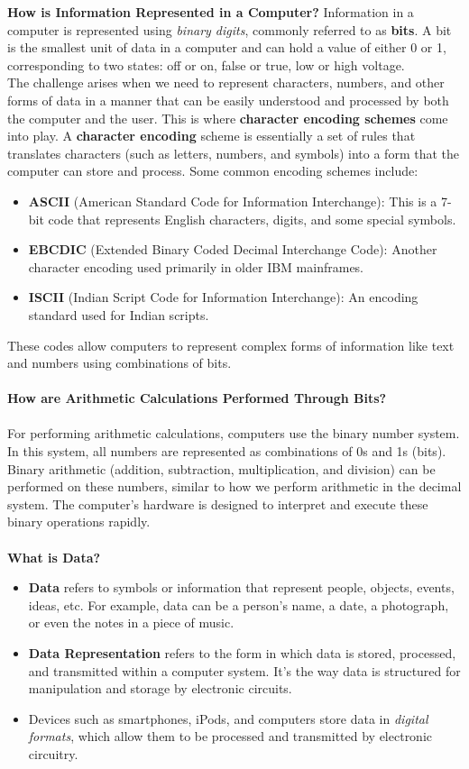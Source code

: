 \documentclass[12pt, oneside]{book}
\begin{document}
\textbf{How is Information Represented in a Computer?}  
Information in a computer is represented using \textit{binary digits}, commonly referred to as \textbf{bits}. A bit is the smallest unit of data in a computer and can hold a value of either 0 or 1, corresponding to two states: off or on, false or true, low or high voltage. \\
The challenge arises when we need to represent characters, numbers, and other forms of data in a manner that can be easily understood and processed by both the computer and the user. This is where \textbf{character encoding schemes} come into play.
A \textbf{character encoding} scheme is essentially a set of rules that translates characters (such as letters, numbers, and symbols) into a form that the computer can store and process. Some common encoding schemes include:
\begin{itemize}
	\item \textbf{ASCII} (American Standard Code for Information Interchange): This is a 7-bit code that represents English characters, digits, and some special symbols.
	\item \textbf{EBCDIC} (Extended Binary Coded Decimal Interchange Code): Another character encoding used primarily in older IBM mainframes.
	\item \textbf{ISCII} (Indian Script Code for Information Interchange): An encoding standard used for Indian scripts.
\end{itemize}
These codes allow computers to represent complex forms of information like text and numbers using combinations of bits.\\\\
\textbf{How are Arithmetic Calculations Performed Through Bits?}\\\\
For performing arithmetic calculations, computers use the binary number system. In this system, all numbers are represented as combinations of 0s and 1s (bits). Binary arithmetic (addition, subtraction, multiplication, and division) can be performed on these numbers, similar to how we perform arithmetic in the decimal system. The computer’s hardware is designed to interpret and execute these binary operations rapidly.\\\\
\textbf{What is Data?}
\begin{itemize}
	\item \textbf{Data} refers to symbols or information that represent people, objects, events, ideas, etc. For example, data can be a person's name, a date, a photograph, or even the notes in a piece of music.
	\item \textbf{Data Representation} refers to the form in which data is stored, processed, and transmitted within a computer system. It’s the way data is structured for manipulation and storage by electronic circuits.
	\item Devices such as smartphones, iPods, and computers store data in \textit{digital formats}, which allow them to be processed and transmitted by electronic circuitry.
\end{itemize}
\end{document}
